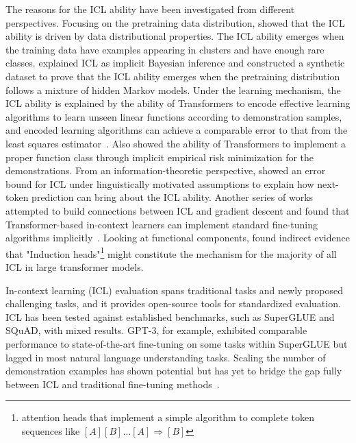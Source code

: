 The reasons for the ICL ability have been investigated from different perspectives.
Focusing on the pretraining data distribution, \textcite{chan2022data} showed that the ICL ability is driven by data distributional properties.
The ICL ability emerges when the training data have examples appearing in clusters and have enough rare classes.
\textcite{xie2022an} explained ICL as implicit Bayesian inference and constructed a synthetic dataset to prove that the ICL ability emerges when the pretraining distribution follows a mixture of hidden Markov models.
Under the learning mechanism, the ICL ability is explained by the ability of Transformers to encode effective learning algorithms to learn unseen linear functions according to demonstration samples, and encoded learning algorithms can achieve a comparable error to that from the least squares estimator~\cite{garg2023transformers}.
Also \textcite{li2023transformers} showed the ability of Transformers to implement a proper function class through implicit empirical risk minimization for the demonstrations.
From an information-theoretic perspective, \textcite{hahn2023theory} showed an error bound for ICL under linguistically motivated assumptions to explain how next-token prediction can bring about the ICL ability.
Another series of works attempted to build connections between ICL and gradient descent and found that Transformer-based in-context learners can implement standard fine-tuning algorithms implicitly~\cite{akyurek2022what, vonoswald2023transformers, li2023transformers}.
Looking at functional components, \textcite{olsson2022incontext} found indirect evidence that "Induction heads"\footnote{attention heads that implement a simple algorithm to complete token sequences like $[A][B] \dots [A] \Rightarrow [B]$} might constitute the mechanism for the majority of all ICL in large transformer models.

In-context learning (ICL) evaluation spans traditional tasks and newly proposed challenging tasks, and it provides open-source tools for standardized evaluation.
ICL has been tested against established benchmarks, such as SuperGLUE and SQuAD, with mixed results.
GPT-3, for example, exhibited comparable performance to state-of-the-art fine-tuning on some tasks within SuperGLUE but lagged in most natural language understanding tasks.
Scaling the number of demonstration examples has shown potential but has yet to bridge the gap fully between ICL and traditional fine-tuning methods~\cite{brown2020language, hao2022structured}.

